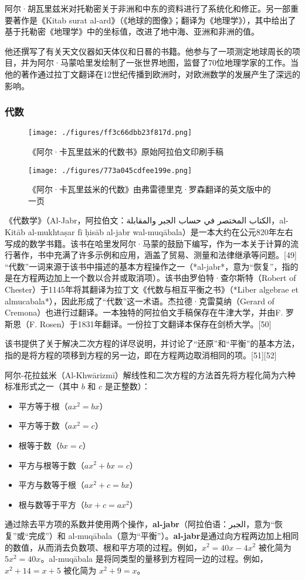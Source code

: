 阿尔·胡瓦里兹米对托勒密关于非洲和中东的资料进行了系统化和修正。另一部重要著作是《Kitab surat al-ard》（《地球的图像》；翻译为《地理学》），其中给出了基于托勒密《地理学》中的坐标值，改进了地中海、亚洲和非洲的值。

他还撰写了有关天文仪器如天体仪和日晷的书籍。他参与了一项测定地球周长的项目，并为阿尔·马蒙哈里发绘制了一张世界地图，监督了70位地理学家的工作。当他的著作通过拉丁文翻译在12世纪传播到欧洲时，对欧洲数学的发展产生了深远的影响。
\subsubsection{代数}
\begin{figure}[ht]
\centering
\texttt{[image: ./figures/ff3c66dbb23f817d.png]}
\caption{《阿尔·卡瓦里兹米的代数书》原始阿拉伯文印刷手稿} \label{fig_HLZM_6}
\end{figure}
\begin{figure}[ht]
\centering
\texttt{[image: ./figures/773a045cdfee199e.png]}
\caption{《阿尔·卡瓦里兹米的代数》由弗雷德里克·罗森翻译的英文版中的一页} \label{fig_HLZM_7}
\end{figure}
《代数学》（Al-Jabr，阿拉伯文：الكتاب المختصر في حساب الجبر والمقابلة，al-Kitāb al-mukhtaṣar fī ḥisāb al-jabr wal-muqābala）是一本大约在公元820年左右写成的数学书籍。该书在哈里发阿尔·马蒙的鼓励下编写，作为一本关于计算的流行著作，书中充满了许多示例和应用，涵盖了贸易、测量和法律继承等问题。[49] “代数”一词来源于该书中描述的基本方程操作之一（*al-jabr*，意为“恢复”，指的是在方程两边加上一个数以合并或取消项）。该书由罗伯特·查尔斯特（Robert of Chester）于1145年将其翻译为拉丁文《代数与相互平衡之书》（*Liber algebrae et almucabala*），因此形成了“代数”这一术语。杰拉德·克雷莫纳（Gerard of Cremona）也进行过翻译。一本独特的阿拉伯文手稿保存在牛津大学，并由F. 罗斯恩（F. Rosen）于1831年翻译。一份拉丁文翻译本保存在剑桥大学。[50]

该书提供了关于解决二次方程的详尽说明，并讨论了“还原”和“平衡”的基本方法，指的是将方程的项移到方程的另一边，即在方程两边取消相同的项。[51][52]

阿尔-花拉兹米（Al-Khwārizmī）解线性和二次方程的方法首先将方程化简为六种标准形式之一（其中 \(b\) 和 \(c\) 是正整数）：
\begin{itemize}
\item 平方等于根（\(ax^2 = bx\)）
\item 平方等于数（\(ax^2 = c\)）
\item 根等于数（\(bx = c\)）
\item 平方与根等于数（\(ax^2 + bx = c\)）
\item 平方与数等于根（\(ax^2 + c = bx\)）
\item 根与数等于平方（\(bx + c = ax^2\)）
\end{itemize}
通过除去平方项的系数并使用两个操作，\textbf{al-jabr}（阿拉伯语：الجبر，意为“恢复”或“完成”）和 al-muqābala（意为“平衡”）。\textbf{al-jabr}是通过向方程两边加上相同的数值，从而消去负数项、根和平方项的过程。例如，\(x^2 = 40x - 4x^2\) 被化简为 \(5x^2 = 40x\)。al-muqābala 是将同类型的量移到方程同一边的过程。例如，\(x^2 + 14 = x + 5\) 被化简为 \(x^2 + 9 = x\)。


